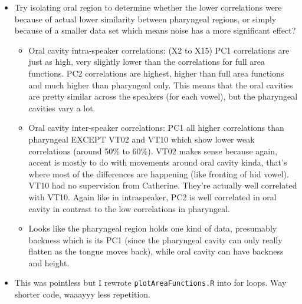 \documentclass{article}
\begin{document}
\begin{itemize}
    \item Try isolating oral region to determine whether the lower correlations were because of actual lower similarity between pharyngeal regions, or simply because of a smaller data set which means noise has a more significant effect?
    \begin{itemize}
        \item Oral cavity intra-speaker correlations: (X2 to X15) PC1 correlations are just as high, very slightly lower than the correlations for full area functions. PC2 correlations are highest, higher than full area functions and much higher than pharyngeal only. This means that the oral cavities are pretty similar across the speakers (for each vowel), but the pharyngeal cavities vary a lot.
        \item Oral cavity inter-speaker correlations: PC1 all higher correlations than pharyngeal EXCEPT VT02 and VT10 which show lower weak correlations (around 50\% to 60\%). VT02 makes sense because again, accent is mostly to do with movements around oral cavity kinda, that's where most of the differences are happening (like fronting of hid vowel). VT10 had no supervision from Catherine. They're actually well correlated with VT10. Again like in intraspeaker, PC2 is well correlated in oral cavity in contrast to the low correlations in pharyngeal. 
        \item Looks like the pharyngeal region holds one kind of data, presumably backness which is its PC1 (since the pharyngeal cavity can only really flatten as the tongue moves back), while oral cavity can have backness and height.
    \end{itemize}
    \item This was pointless but I rewrote \verb|plotAreaFunctions.R| into for loops. Way shorter code, waaayyy less repetition.
\end{itemize}
\end{document}
